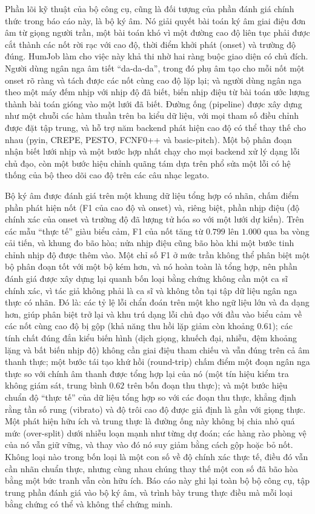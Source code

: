 \documentclass[12pt,a4paper]{article}
\begin{document}
Phần lõi kỹ thuật của bộ công cụ, cũng là đối tượng của phần đánh giá chính thức
trong báo cáo này, là bộ ký âm. Nó giải quyết bài toán ký âm giai điệu đơn âm từ
giọng người trần, một bài toán khó vì một đường cao độ liên tục phải được cắt
thành các nốt rời rạc với cao độ, thời điểm khởi phát (onset) và trường độ đúng.
HumJob làm cho việc này khả thi nhờ hai ràng buộc giao diện có chủ đích. Người
dùng ngân nga âm tiết ``da-da-da'', trong đó phụ âm tạo cho mỗi nốt một onset rõ
ràng và tách được các nốt cùng cao độ lặp lại; và người dùng ngân nga theo một máy
đếm nhịp với nhịp độ đã biết, biến nhịp điệu từ bài toán ước lượng thành bài toán
gióng vào một lưới đã biết. Đường ống (pipeline) được xây dựng như một chuỗi các
hàm thuần trên ba kiểu dữ liệu, với mọi tham số điều chỉnh được đặt tập trung, và
hỗ trợ năm backend phát hiện cao độ có thể thay thế cho nhau (pyin, CREPE, PESTO,
FCNF0++ và basic-pitch). Một bộ phân đoạn nhận biết lưới nhịp và một bước hợp nhất
chạy cho mọi backend xử lý dạng lỗi chủ đạo, còn một bước hiệu chỉnh quãng tám dựa
trên phổ sửa một lỗi có hệ thống của bộ theo dõi cao độ trên các câu nhạc legato.

Bộ ký âm được đánh giá trên một khung dữ liệu tổng hợp có nhãn, chấm điểm phần phát
hiện nốt (F1 của cao độ và onset) và, riêng biệt, phần nhịp điệu (độ chính xác của
onset và trường độ đã lượng tử hóa so với một lưới dự kiến). Trên các mẫu ``thực
tế'' giàu biểu cảm, F1 của nốt tăng từ $0.799$ lên $1.000$ qua ba vòng cải tiến, và
khung đo bão hòa; nửa nhịp điệu cũng bão hòa khi một bước tinh chỉnh nhịp độ được
thêm vào. Một chỉ số F1 ở mức trần không thể phân biệt một bộ phân đoạn tốt với một
bộ kém hơn, và nó hoàn toàn là tổng hợp, nên phần đánh giá được xây dựng lại quanh
bốn loại bằng chứng không cần một ca sĩ chính xác, vì tác giả không phải là ca sĩ
và không tồn tại tập dữ liệu ngân nga thực có nhãn. Đó là: các tỷ lệ lỗi chẩn đoán
trên một kho ngữ liệu lớn và đa dạng hơn, giúp phân biệt trở lại và khu trú dạng
lỗi chủ đạo với đầu vào biểu cảm về các nốt cùng cao độ bị gộp (khả năng thu hồi
lặp giảm còn khoảng $0.61$); các tính chất đúng đắn kiểu biến hình (dịch giọng,
khuếch đại, nhiễu, đệm khoảng lặng và bất biến nhịp độ) không cần giai điệu tham
chiếu và vẫn đúng trên cả âm thanh thực; một bước tái tạo khứ hồi (round-trip) chấm
điểm một đoạn ngân nga thực so với chính âm thanh được tổng hợp lại của nó (một tín
hiệu kiểm tra không giám sát, trung bình $0.62$ trên bốn đoạn thu thực); và một bước
hiệu chuẩn độ ``thực tế'' của dữ liệu tổng hợp so với các đoạn thu thực, khẳng định
rằng tần số rung (vibrato) và độ trôi cao độ được giả định là gần với giọng thực.
Một phát hiện hữu ích và trung thực là đường ống này không bị chia nhỏ quá mức
(over-split) dưới nhiễu loạn mạnh như từng dự đoán; các hàng rào phòng vệ của nó
vẫn giữ vững, và thay vào đó nó suy giảm bằng cách gộp hoặc bỏ nốt. Không loại nào
trong bốn loại là một con số về độ chính xác thực tế, điều đó vẫn cần nhãn chuẩn
thực, nhưng cùng nhau chúng thay thế một con số đã bão hòa bằng một bức tranh vẫn
còn hữu ích. Báo cáo này ghi lại toàn bộ bộ công cụ, tập trung phần đánh giá vào bộ
ký âm, và trình bày trung thực điều mà mỗi loại bằng chứng có thể và không thể
chứng minh.
\end{document}
